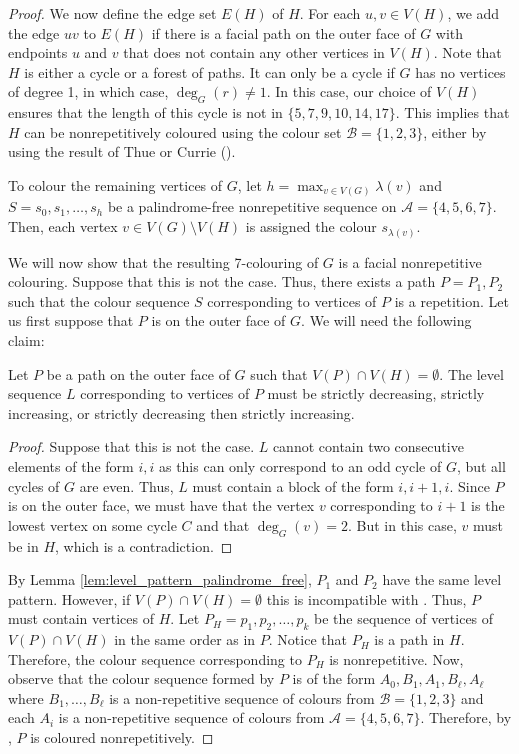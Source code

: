 \documentclass{patmorin}
\begin{document}
\begin{proof}
We now define the edge set $E(H)$ of $H$.  For each $u,v\in V(H)$,
we add the edge $uv$ to $E(H)$ if there is a facial path on the outer
face of $G$ with endpoints $u$ and $v$ that does not contain any other
vertices in $V(H)$.  Note that $H$ is either a cycle or a forest of
paths. It can only be a cycle if $G$ has no vertices of degree 1,
in which case, $\deg_G(r)\neq 1$.  In this case, our choice of $V(H)$
ensures that the length of this cycle is not in  $\{5,7,9,10,14,17\}$.
This implies that $H$ can be nonrepetitively coloured using the colour set
$\mathcal{B}=\{1,2,3\}$, either by using the result of Thue \cite{thue1906uber}
or Currie ().

To colour the remaining vertices of $G$, let $h=\max_{v \in V(G)}
\lambda(v)$ and $S=s_0,s_1,\ldots,s_h$ be a palindrome-free nonrepetitive
sequence on $\mathcal{A}=\{4,5,6,7\}$.  Then, each vertex $v\in
V(G)\setminus V(H)$ is assigned the colour $s_{\lambda(v)}$.

We will now show that the resulting 7-colouring of $G$ is a facial
nonrepetitive colouring. Suppose that this is not the case. Thus,
there exists a path $P=P_1,P_2$ such that the colour sequence $S$
corresponding to vertices of $P$ is a repetition. Let us first suppose
that $P$ is on the outer face of $G$. We will need the following claim:

 \begin{clm}
  Let $P$ be a path on the outer face of $G$ such that $V(P) \cap V(H) = \emptyset$. The level sequence $L$ corresponding to vertices of $P$ must be strictly decreasing, strictly increasing, or strictly decreasing then strictly increasing.
 \end{clm}
 \begin{proof}
 Suppose that this is not the case. $L$ cannot contain two consecutive
 elements of the form $i,i$ as this can only correspond to an odd cycle
 of $G$, but all cycles of $G$ are even. Thus, $L$ must contain a block
 of the form $i,i+1,i$. Since $P$ is on the outer face, we must have
 that the vertex $v$ corresponding to $i+1$ is the lowest vertex on some
 cycle $C$ and that $\deg_G(v)=2$. But in this case, $v$ must be in $H$,
 which is a contradiction.
 \end{proof}
 By Lemma \ref{lem:level_pattern_palindrome_free}, $P_1$ and $P_2$ have
 the same level pattern. However, if $V(P) \cap V(H) = \emptyset$ this
 is incompatible with .  Thus, $P$ must contain
 vertices of $H$. Let $P_H=p_1,p_2,\ldots,p_k$ be the sequence of vertices
 of $V(P) \cap V(H)$ in the same order as in $P$. Notice that $P_H$ is
 a path in $H$.  Therefore, the colour sequence corresponding to $P_H$
 is nonrepetitive.  Now, observe that the colour sequence formed by $P$
 is of the form $A_0,B_1,A_1,B_\ell,A_\ell$ where $B_1,\ldots,B_\ell$
 is a non-repetitive sequence of colours from $\mathcal{B}=\{1,2,3\}$ and
 each $A_i$ is a non-repetitive sequence of colours from $\mathcal{A}=\{4,5,6,7\}$.
 Therefore, by , $P$ is coloured nonrepetitively.


\end{proof}
\end{document}
